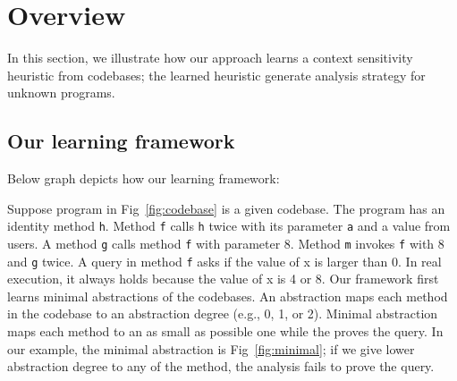 \section{Overview}
In this section, we illustrate how our approach learns a context sensitivity heuristic from codebases; the learned heuristic generate analysis strategy for unknown programs. 

\subsection{Our learning framework}
Below graph depicts how our learning framework:
\begin{center}
\end{center}
Suppose program in Fig~\ref{fig:codebase} is a given codebase. The program has an identity method {\tt h}.
Method {\tt f} calls {\tt h} twice with its parameter {\tt a} and a value from users. A method {\tt g} calls method {\tt f} with parameter 8. Method {\tt m} invokes {\tt f} with 8 and {\tt g} twice.
A query in method {\tt f} asks if the value of x is larger than 0. In real execution, it always holds because the value of x is 4 or 8. 
Our framework first learns minimal abstractions of the codebases. 
An abstraction maps each method in the codebase to an abstraction degree (e.g., 0, 1, or 2).
Minimal abstraction maps each method to an as small as possible one while the proves the query. 
In our example, the minimal abstraction is Fig~\ref{fig:minimal}; if we give lower abstraction degree to any of the method, the analysis fails to prove the query.



